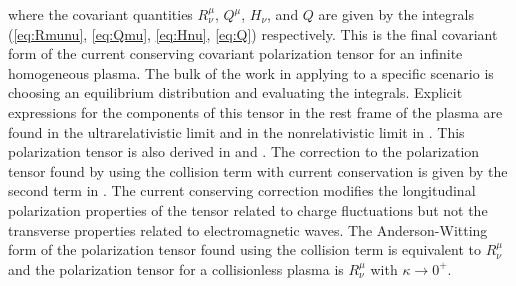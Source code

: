 where the covariant quantities $R^\mu_\nu$, $Q^\mu$, $H_\nu$, and $Q$ are given by the integrals (\ref{eq:Rmunu}, \ref{eq:Qmu}, \ref{eq:Hnu}, \ref{eq:Q}) respectively. 
This is the final covariant form of the current conserving covariant polarization tensor for an infinite homogeneous plasma. The bulk of the work in applying  to a specific scenario is choosing an equilibrium distribution and evaluating the integrals. Explicit expressions for the components of this tensor in the rest frame of the plasma are found in the ultrarelativistic limit  and in the nonrelativistic limit  in \cite{Formanek:2021blc}.
This polarization tensor is also derived in \cite{Carrington:2003je} and \cite{Schenke:2006xu}. The correction to the polarization tensor found by using the collision term with current conservation  is given by the second term in . The current conserving correction modifies the longitudinal polarization properties of the tensor related to charge fluctuations but not the transverse properties related to electromagnetic waves. The Anderson-Witting form of the polarization tensor found using the collision term  is equivalent to $R^\mu_\nu$ and the polarization tensor for a collisionless plasma is $R^\mu_\nu$ with $\kappa \rightarrow 0^+$.

